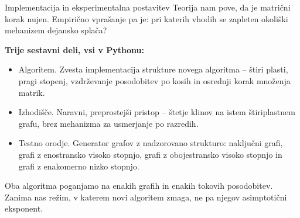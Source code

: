 \documentclass[aspectratio=169,10pt]{beamer}
\begin{document}

\begin{frame}{Implementacija in eksperimentalna postavitev}
  Teorija nam pove, da je matrični korak nujen. Empirično vprašanje pa je: \alert{pri katerih vhodih se zapleten okoliški mehanizem dejansko splača?}

  \vspace{0.6em}
  \textbf{Trije sestavni deli, vsi v Pythonu:}
  \begin{itemize}
    \item \alert{Algoritem.} Zvesta implementacija strukture novega algoritma -- štiri plasti, pragi stopenj, vzdrževanje posodobitev po kosih in osrednji korak množenja matrik.
    \item \alert{Izhodišče.} Naravni, preprostejši pristop -- štetje klinov na istem štiriplastnem grafu, brez mehanizma za usmerjanje po razredih.
    \item \alert{Testno orodje.} Generator grafov z nadzorovano strukturo: naključni grafi, grafi z enostransko visoko stopnjo, grafi z obojestransko visoko stopnjo in grafi z enakomerno nizko stopnjo.
  \end{itemize}

  \vspace{0.4em}
  Oba algoritma poganjamo na enakih grafih in enakih tokovih posodobitev. Zanima nas \alert{režim, v katerem novi algoritem zmaga}, ne pa njegov asimptotični eksponent.
\end{frame}
\end{document}
